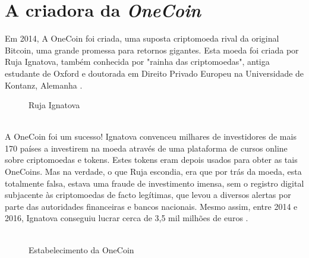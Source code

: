 \documentclass{report}
\begin{document}
\section{A criadora da \textit{OneCoin}}
Em 2014, A OneCoin foi criada, uma suposta criptomoeda rival da original Bitcoin, uma grande promessa para retornos gigantes. Esta moeda foi criada por Ruja Ignatova, também conhecida por "rainha das criptomoedas", antiga estudante de Oxford e doutorada em Direito Privado Europeu na Universidade de Kontanz, Alemanha \cite{osmaisprocurados}.
\begin{figure}[h]
    \center
    \caption{Ruja Ignatova}
    \label{rujaignatova}
\end{figure}
\\
A OneCoin foi um sucesso! Ignatova convenceu milhares de investidores de mais 170 países a investirem na moeda através de uma plataforma de cursos online sobre criptomoedas e tokens. Estes tokens eram depois usados para obter as tais OneCoins. Mas na verdade, o que Ruja escondia, era que por trás da moeda, esta totalmente falsa, estava uma fraude de investimento imensa, sem o registro digital subjacente às criptomoedas de facto legítimas, que levou a diversos alertas por parte das autoridades financeiras e bancos nacionais. Mesmo assim, entre 2014 e 2016, Ignatova conseguiu lucrar cerca de 3,5 mil milhões de euros \cite{osmaisprocurados}. \\ \indent
\\
\begin{figure}[h!]
    \center
    \caption{Estabelecimento da OneCoin}
    \label{onecoin}
\end{figure}
\end{document}
